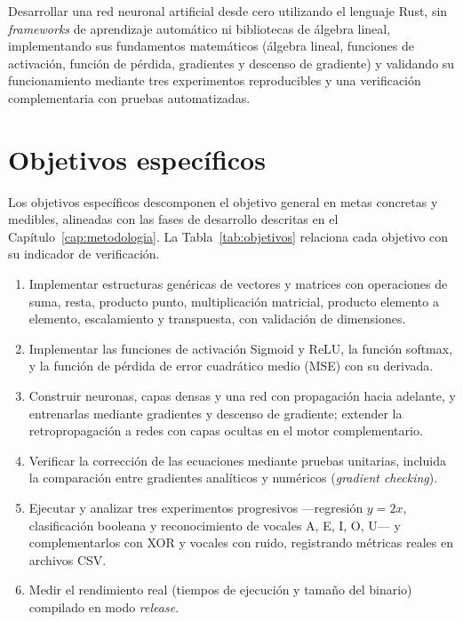 \begin{nota}
Desarrollar una red neuronal artificial desde cero utilizando el lenguaje Rust, sin \emph{frameworks} de aprendizaje automático ni bibliotecas de álgebra lineal, implementando sus fundamentos matemáticos (álgebra lineal, funciones de activación, función de pérdida, gradientes y descenso de gradiente) y validando su funcionamiento mediante tres experimentos reproducibles y una verificación complementaria con pruebas automatizadas.
\end{nota}

\section{Objetivos específicos}\label{sec:objespecificos}
Los objetivos específicos descomponen el objetivo general en metas concretas y medibles, alineadas con las fases de desarrollo descritas en el Capítulo~\ref{cap:metodologia}. La Tabla~\ref{tab:objetivos} relaciona cada objetivo con su indicador de verificación.

\begin{enumerate}[label=\textbf{OE\arabic*.},leftmargin=3.2em,itemsep=4pt]
\item Implementar estructuras genéricas de vectores y matrices con operaciones de suma, resta, producto punto, multiplicación matricial, producto elemento a elemento, escalamiento y transpuesta, con validación de dimensiones.
\item Implementar las funciones de activación Sigmoid y ReLU, la función softmax, y la función de pérdida de error cuadrático medio (MSE) con su derivada.
\item Construir neuronas, capas densas y una red con propagación hacia adelante, y entrenarlas mediante gradientes y descenso de gradiente; extender la retropropagación a redes con capas ocultas en el motor complementario.
\item Verificar la corrección de las ecuaciones mediante pruebas unitarias, incluida la comparación entre gradientes analíticos y numéricos (\emph{gradient checking}).
\item Ejecutar y analizar tres experimentos progresivos ---regresión $y=2x$, clasificación booleana y reconocimiento de vocales A, E, I, O, U--- y complementarlos con XOR y vocales con ruido, registrando métricas reales en archivos CSV.
\item Medir el rendimiento real (tiempos de ejecución y tamaño del binario) compilado en modo \emph{release}.
\end{enumerate}

